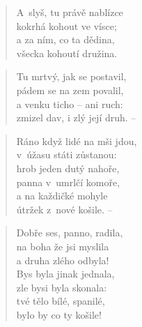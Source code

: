 \begin{verse}
A~slyš, tu právě nablízce \\
kokrhá kohout ve vísce; \\
a za ním, co ta dědina, \\
všecka kohoutí družina.
\end{verse}

\begin{verse}
Tu mrtvý, jak se postavil, \\
pádem se na zem povalil, \\
a venku ticho -- ani ruch: \\
zmizel dav, i zlý její druh. --
\end{verse}

\begin{verse}
Ráno když lidé na mši jdou, \\
v~úžasu státi zůstanou: \\
hrob jeden dutý nahoře, \\
panna v~umrlčí komoře, \\
a na každičké mohyle \\
útržek z~nové košile. --
\end{verse}

\begin{verse}
Dobře ses, panno, radila, \\
na boha že jsi myslila \\
a druha zlého odbyla! \\
Bys byla jinak jednala, \\
zle bysi byla skonala: \\
tvé tělo bílé, spanilé, \\
bylo by co ty košile!
\end{verse}